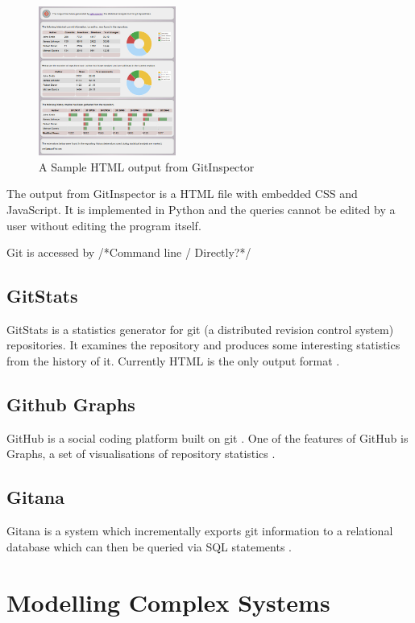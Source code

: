\documentclass[11pt]{book}
\begin{document}
\begin{figure}[h]
	\centering
	\includegraphics[width=0.4\textwidth]{images/gitinspector}
	\caption{A Sample HTML output from GitInspector \cite{gitinspector}}
	\label{fig:gitbranching}
\end{figure} 

The output from GitInspector is a HTML file with embedded CSS and JavaScript. It is implemented in Python and the queries cannot be edited by a user without editing the program itself.

Git is accessed by /*Command line / Directly?*/


\subsection{GitStats}
GitStats is a statistics generator for git (a distributed revision control system) repositories. It examines the repository and produces some interesting statistics from the history of it. Currently HTML is the only output format \cite{gitstats}. 

\subsection{Github Graphs}
GitHub is a social coding platform built on git \cite{gitpowersgithub}. One of the features of GitHub is Graphs, a set of visualisations of repository statistics \cite{githubgraphs}.
 
\subsection{Gitana}
Gitana is a system which incrementally exports git information to a relational database which can then be queried via SQL statements \cite{gitana}.

\section{Modelling Complex Systems}
\end{document}
